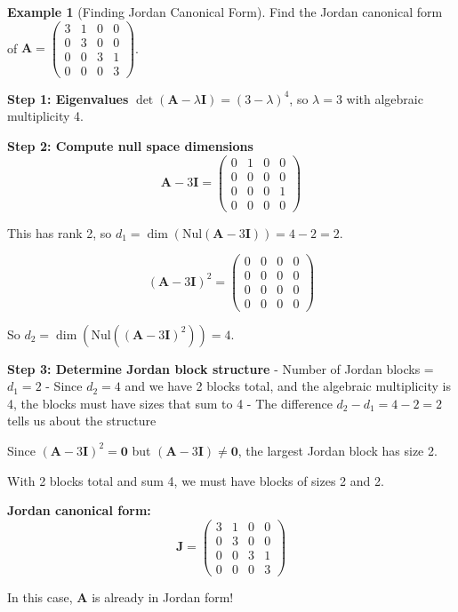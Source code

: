 \documentclass[12pt]{article}
\numberwithin{equation}{section}
\newcommand{\mat}[1]{\mathbf{#1}}        %
\theoremstyle{plain}
\theoremstyle{definition}
\newtheorem{example}[theorem]{Example}
\theoremstyle{remark}
\begin{document}
\begin{example}[Finding Jordan Canonical Form]
Find the Jordan canonical form of $\mat{A} = \begin{pmatrix} 3 & 1 & 0 & 0 \\ 0 & 3 & 0 & 0 \\ 0 & 0 & 3 & 1 \\ 0 & 0 & 0 & 3 \end{pmatrix}$.

\textbf{Step 1: Eigenvalues}
$\det(\mat{A} - \lambda\mat{I}) = (3 - \lambda)^4$, so $\lambda = 3$ with algebraic multiplicity 4.

\textbf{Step 2: Compute null space dimensions}
$$\mat{A} - 3\mat{I} = \begin{pmatrix} 0 & 1 & 0 & 0 \\ 0 & 0 & 0 & 0 \\ 0 & 0 & 0 & 1 \\ 0 & 0 & 0 & 0 \end{pmatrix}$$

This has rank 2, so $d_1 = \dim(\text{Nul}(\mat{A} - 3\mat{I})) = 4 - 2 = 2$.

$$(\mat{A} - 3\mat{I})^2 = \begin{pmatrix} 0 & 0 & 0 & 0 \\ 0 & 0 & 0 & 0 \\ 0 & 0 & 0 & 0 \\ 0 & 0 & 0 & 0 \end{pmatrix}$$

So $d_2 = \dim(\text{Nul}((\mat{A} - 3\mat{I})^2)) = 4$.

\textbf{Step 3: Determine Jordan block structure}
- Number of Jordan blocks = $d_1 = 2$
- Since $d_2 = 4$ and we have 2 blocks total, and the algebraic multiplicity is 4, the blocks must have sizes that sum to 4
- The difference $d_2 - d_1 = 4 - 2 = 2$ tells us about the structure

Since $(\mat{A} - 3\mat{I})^2 = \mat{0}$ but $(\mat{A} - 3\mat{I}) \neq \mat{0}$, the largest Jordan block has size 2.

With 2 blocks total and sum 4, we must have blocks of sizes 2 and 2.

\textbf{Jordan canonical form:}
$$\mat{J} = \begin{pmatrix} 3 & 1 & 0 & 0 \\ 0 & 3 & 0 & 0 \\ 0 & 0 & 3 & 1 \\ 0 & 0 & 0 & 3 \end{pmatrix}$$

In this case, $\mat{A}$ is already in Jordan form!
\end{example}
\end{document}
